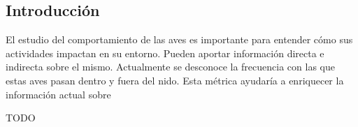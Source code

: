 



\subsection{Introducción}


El estudio del comportamiento de las aves es importante para entender cómo sus actividades impactan en su entorno. Pueden aportar información directa e indirecta sobre el mismo. Actualmente se desconoce la frecuencia con las que estas aves pasan dentro y fuera del nido. Esta métrica ayudaría a enriquecer la información actual sobre 


TODO

